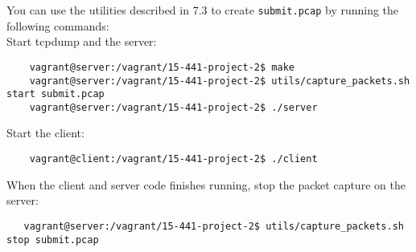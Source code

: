 You can use the utilities described in 7.3 to create \texttt{submit.pcap} by running the following commands: \\

Start tcpdump and the server:
\begin{verbatim}
    vagrant@server:/vagrant/15-441-project-2$ make
    vagrant@server:/vagrant/15-441-project-2$ utils/capture_packets.sh start submit.pcap
    vagrant@server:/vagrant/15-441-project-2$ ./server 
\end{verbatim}

Start the client:
\begin{verbatim}
    vagrant@client:/vagrant/15-441-project-2$ ./client
\end{verbatim}

When the client and server code finishes running, stop the packet capture on the server:
\begin{verbatim}
   vagrant@server:/vagrant/15-441-project-2$ utils/capture_packets.sh stop submit.pcap
\end{verbatim}


